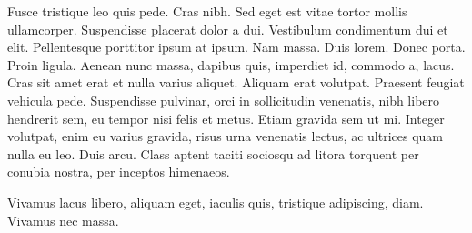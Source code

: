 Fusce tristique leo quis pede. Cras nibh. Sed eget est vitae tortor mollis
ullamcorper. Suspendisse placerat dolor a dui. Vestibulum condimentum dui et
elit. Pellentesque porttitor ipsum at ipsum. Nam massa. Duis lorem. Donec porta.
Proin ligula. Aenean nunc massa, dapibus quis, imperdiet id, commodo a, lacus.
Cras sit amet erat et nulla varius aliquet. Aliquam erat volutpat. Praesent
feugiat vehicula pede. Suspendisse pulvinar, orci in sollicitudin venenatis,
nibh libero hendrerit sem, eu tempor nisi felis et metus. Etiam gravida sem ut
mi. Integer volutpat, enim eu varius gravida, risus urna venenatis lectus, ac
ultrices quam nulla eu leo. Duis arcu. Class aptent taciti sociosqu ad litora
torquent per conubia nostra, per inceptos himenaeos.

Vivamus lacus libero, aliquam eget, iaculis quis, tristique adipiscing, diam.
Vivamus nec massa.


\outroformatting

